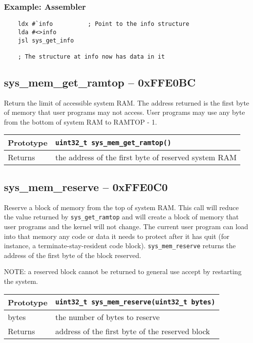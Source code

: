 \subsubsection*{Example: Assembler}
\begin{verbatim}
    ldx #`info			; Point to the info structure
    lda #<>info
    jsl sys_get_info

    ; The structure at info now has data in it
\end{verbatim}


\subsection*{sys\_mem\_get\_ramtop -- 0xFFE0BC}
Return the limit of accessible system RAM. The address returned is the first byte of memory that user programs may not access.
User programs may use any byte from the bottom of system RAM to RAMTOP - 1.

\bigskip

\begin{tabular}{|l||l|} \hline
Prototype & \lstinline!uint32_t sys_mem_get_ramtop()! \\ \hline
Returns & the address of the first byte of reserved system RAM \\ \hline
\end{tabular}


\subsection*{sys\_mem\_reserve -- 0xFFE0C0}
Reserve a block of memory from the top of system RAM.
This call will reduce the value returned by \lstinline|sys_get_ramtop| and will create a block of memory that user programs and the kernel will not change.
The current user program can load into that memory any code or data it needs to protect after it has quit
(for instance, a terminate-stay-resident code block). \lstinline|sys_mem_reserve| returns the address of the first byte of the block reserved.

NOTE: a reserved block cannot be returned to general use accept by restarting the system.

\bigskip

\begin{tabular}{|l||l|} \hline
Prototype & \lstinline!uint32_t sys_mem_reserve(uint32_t bytes)! \\ \hline
bytes & the number of bytes to reserve \\ \hline
Returns & address of the first byte of the reserved block \\ \hline
\end{tabular}

